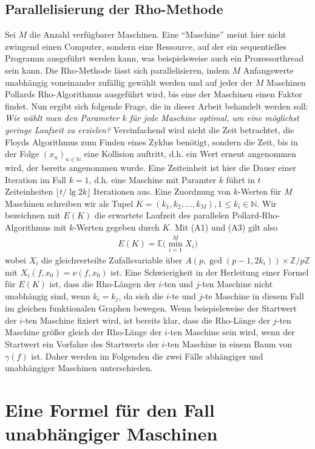 \documentclass[a4paper, 10pt, ngerman]{article}
\newcommand{\N}{\mathbb{N}}
\newcommand{\Z}{\mathbb{Z}}
\newcommand{\E}{\mathbb{E}}
\begin{document}
\subsection{Parallelisierung der Rho-Methode}

Sei $M$ die Anzahl verfügbarer Maschinen. Eine "`Maschine"'  meint hier nicht zwingend einen Computer, sondern eine Ressource, auf der ein sequentielles Programm ausgeführt werden kann, was beispielsweise auch ein Prozessorthread sein kann. Die Rho-Methode lässt sich parallelisieren, indem $M$ Anfangswerte unabhängig voneinander zufällig gewählt werden und auf jeder der $M$ Maschinen Pollards Rho-Algorithmus ausgeführt wird, bis eine der Maschinen einen Faktor findet. Nun ergibt sich folgende Frage, die in dieser Arbeit behandelt werden soll: \emph{Wie wählt man den Parameter $k$ für jede Maschine optimal, um eine möglichst geringe Laufzeit zu erzielen?} Vereinfachend wird nicht die Zeit betrachtet, die Floyds Algorithmus zum Finden eines Zyklus benötigt, sondern die Zeit, bis in der Folge $(x_n)_{n \in \N}$ eine Kollision auftritt, d.h. ein Wert erneut angenommen wird, der bereits angenommen wurde. Eine Zeiteinheit ist hier die Dauer einer Iteration im Fall $k = 1$, d.h. eine Maschine mit Paramter $k$ führt in $t$ Zeiteinheiten $\lfloor t / \lg 2k \rfloor$ Iterationen aus. Eine Zuordnung von $k$-Werten für $M$ Maschinen schreiben wir als Tupel $K = (k_1, k_2, \dots, k_M), 1 \le k_i \in \N$.  Wir bezeichnen mit $E(K)$ die erwartete Laufzeit des parallelen Pollard-Rho-Algorithmus mit $k$-Werten gegeben durch $K$. Mit (A1) und (A3) gilt also
\begin{align*}
    E(K) = \E \bigg ( \min_{i = 1}^M X_i \bigg )
\end{align*}
wobei $X_i$ die gleichverteilte Zufallsvariable über $A(p, \gcd(p - 1, 2k_i)) \times \Z/p\Z$ mit $X_i(f, x_0) = \nu(f, x_0)$ ist. Eine Schwierigkeit in der Herleitung einer Formel für $E(K)$ ist, dass die Rho-Längen der $i$-ten und $j$-ten Maschine nicht unabhängig sind, wenn $k_i = k_j$, da sich die $i$-te und $j$-te Maschine in diesem Fall im gleichen funktionalen Graphen bewegen. Wenn beispielsweise der Startwert der $i$-ten Maschine fixiert wird, ist bereits klar, dass die Rho-Länge der $j$-ten Maschine größer gleich der Rho-Länge der $i$-ten Maschine sein wird, wenn der Startwert ein Vorfahre des Startwerts der $i$-ten Maschine in einem Baum von $\gamma(f)$ ist. Daher werden im Folgenden die zwei Fälle abhängiger und unabhängiger Maschinen unterschieden.

\section{Eine Formel für den Fall unabhängiger Maschinen}
\end{document}
